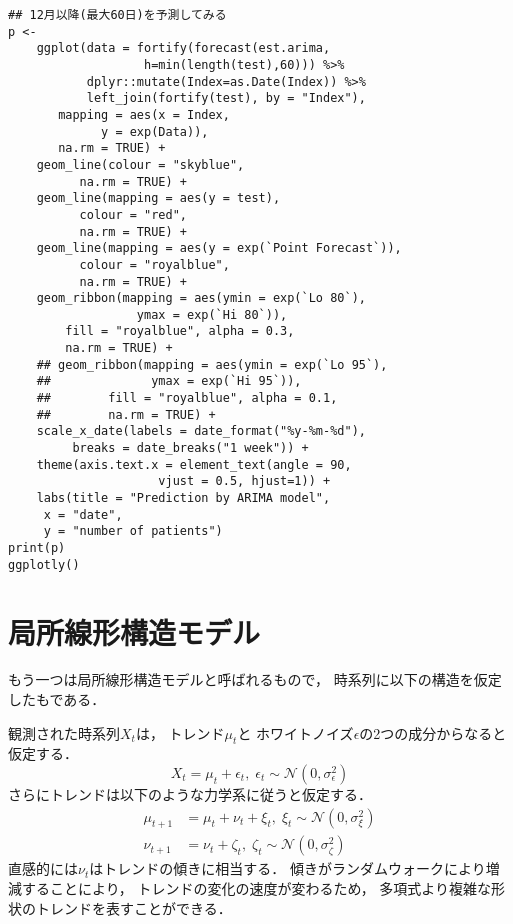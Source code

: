 \documentclass[10pt,oneside,fleqn]{scrartcl}
\begin{document}
\begin{figure}[htbp]
  \centering
  \myGraph[1]{}
\end{figure}

\begin{verbatim}
## 12月以降(最大60日)を予測してみる
p <- 
    ggplot(data = fortify(forecast(est.arima,
				   h=min(length(test),60))) %>%
	       dplyr::mutate(Index=as.Date(Index)) %>%
	       left_join(fortify(test), by = "Index"), 
	   mapping = aes(x = Index,
			 y = exp(Data)),
	   na.rm = TRUE) +
    geom_line(colour = "skyblue",
	      na.rm = TRUE) +
    geom_line(mapping = aes(y = test),
	      colour = "red",
	      na.rm = TRUE) +
    geom_line(mapping = aes(y = exp(`Point Forecast`)),
	      colour = "royalblue",
	      na.rm = TRUE) +
    geom_ribbon(mapping = aes(ymin = exp(`Lo 80`),
			      ymax = exp(`Hi 80`)),
		fill = "royalblue", alpha = 0.3,
		na.rm = TRUE) +
    ## geom_ribbon(mapping = aes(ymin = exp(`Lo 95`),
    ##   			ymax = exp(`Hi 95`)),
    ##   	  fill = "royalblue", alpha = 0.1,
    ##   	  na.rm = TRUE) +
    scale_x_date(labels = date_format("%y-%m-%d"), 
		 breaks = date_breaks("1 week")) + 
    theme(axis.text.x = element_text(angle = 90,
				     vjust = 0.5, hjust=1)) +
    labs(title = "Prediction by ARIMA model",
	 x = "date",
	 y = "number of patients")
print(p)
ggplotly()
\end{verbatim}

\section{局所線形構造モデル}
\label{sec:orgcf4be0b}

もう一つは局所線形構造モデルと呼ばれるもので，  
時系列に以下の構造を仮定したもである．

観測された時系列\(X_{t}\)は，
トレンド\(\mu_{t}\)と
ホワイトノイズ\(\epsilon\)の2つの成分からなると仮定する．
\begin{equation}
  X_{t}=\mu_{t}+\epsilon_{t},\;
  \epsilon_{t}\sim\mathcal{N}(0,\sigma_{\epsilon}^{2})
\end{equation}
さらにトレンドは以下のような力学系に従うと仮定する．
\begin{align}
  \mu_{t+1}
  &=\mu_{t}+\nu_{t}+\xi_{t},\;
    \xi_{t}\sim\mathcal{N}(0,\sigma_{\xi}^{2})\\
  \nu_{t+1}
  &=\nu_{t}+\zeta_{t},\;
    \zeta_{t}\sim\mathcal{N}(0,\sigma_{\zeta}^{2})
\end{align}
直感的には\(\nu_{t}\)はトレンドの傾きに相当する．
傾きがランダムウォークにより増減することにより，
トレンドの変化の速度が変わるため，
多項式より複雑な形状のトレンドを表すことができる．
\end{document}
